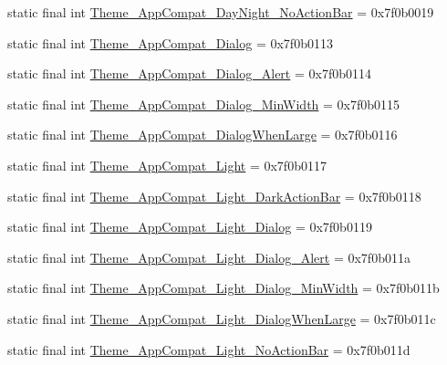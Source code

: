 \begin{CompactItemize}
\item 
static final int \hyperlink{classandroid_1_1support_1_1v7_1_1cardview_1_1_r_1_1style_9476b9cc086d99e64232ec357d8c37d9}{Theme\_\-AppCompat\_\-DayNight\_\-NoActionBar} = 0x7f0b0019
\item 
static final int \hyperlink{classandroid_1_1support_1_1v7_1_1cardview_1_1_r_1_1style_7561b8a83b83704977c3dc1de52c4a1f}{Theme\_\-AppCompat\_\-Dialog} = 0x7f0b0113
\item 
static final int \hyperlink{classandroid_1_1support_1_1v7_1_1cardview_1_1_r_1_1style_7e330412e6286bb70865f4ced62a39ae}{Theme\_\-AppCompat\_\-Dialog\_\-Alert} = 0x7f0b0114
\item 
static final int \hyperlink{classandroid_1_1support_1_1v7_1_1cardview_1_1_r_1_1style_c4c8a8c307a0670058e46175297a6f34}{Theme\_\-AppCompat\_\-Dialog\_\-MinWidth} = 0x7f0b0115
\item 
static final int \hyperlink{classandroid_1_1support_1_1v7_1_1cardview_1_1_r_1_1style_1633c22bb8ed2901933654350fc3b508}{Theme\_\-AppCompat\_\-DialogWhenLarge} = 0x7f0b0116
\item 
static final int \hyperlink{classandroid_1_1support_1_1v7_1_1cardview_1_1_r_1_1style_971d41511beda26b52a13e89e06918e8}{Theme\_\-AppCompat\_\-Light} = 0x7f0b0117
\item 
static final int \hyperlink{classandroid_1_1support_1_1v7_1_1cardview_1_1_r_1_1style_6fff99eb7d5820fd39ceac2d8470b49f}{Theme\_\-AppCompat\_\-Light\_\-DarkActionBar} = 0x7f0b0118
\item 
static final int \hyperlink{classandroid_1_1support_1_1v7_1_1cardview_1_1_r_1_1style_0ad6583f488c89424589b6c38d9c94e5}{Theme\_\-AppCompat\_\-Light\_\-Dialog} = 0x7f0b0119
\item 
static final int \hyperlink{classandroid_1_1support_1_1v7_1_1cardview_1_1_r_1_1style_e33c779f60de62c1c5755d3846dd3fa1}{Theme\_\-AppCompat\_\-Light\_\-Dialog\_\-Alert} = 0x7f0b011a
\item 
static final int \hyperlink{classandroid_1_1support_1_1v7_1_1cardview_1_1_r_1_1style_c873ffc67c53c72a208fb66e42d5497d}{Theme\_\-AppCompat\_\-Light\_\-Dialog\_\-MinWidth} = 0x7f0b011b
\item 
static final int \hyperlink{classandroid_1_1support_1_1v7_1_1cardview_1_1_r_1_1style_211cec5fe4edc88dc815355c236860bd}{Theme\_\-AppCompat\_\-Light\_\-DialogWhenLarge} = 0x7f0b011c
\item 
static final int \hyperlink{classandroid_1_1support_1_1v7_1_1cardview_1_1_r_1_1style_6fc12c0b787f5aa594059db92b66b977}{Theme\_\-AppCompat\_\-Light\_\-NoActionBar} = 0x7f0b011d

\end{CompactItemize}
